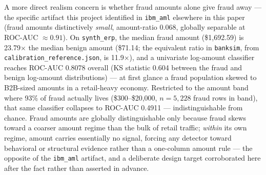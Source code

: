 \begin{table}[t]
\centering
\small
\caption{Realism audit: \texttt{synth\_erp} vs.\ the real-dataset reference band (min--max across \texttt{ibm\_aml}, \texttt{banksim}, \texttt{sap\_wurzburg}, \texttt{paysim}). Source: \texttt{calibration\_reference.json}, \texttt{synth\_erp\_realism.json}.}
\label{tab:synth-realism}
\end{table}

A more direct realism concern is whether fraud amounts alone give fraud away —
the specific artifact this project identified in \texttt{ibm\_aml} elsewhere in
this paper (fraud amounts distinctively \emph{small}, amount-ratio 0.068,
globally separable at ROC-AUC $\approx 0.91$). On \texttt{synth\_erp}, the
median fraud amount (\$1{,}692.59) is 23.79$\times$ the median benign amount
(\$71.14; the equivalent ratio in \texttt{banksim}, from
\texttt{calibration\_reference.json}, is 11.9$\times$), and a univariate
log-amount classifier reaches ROC-AUC 0.8078 overall (KS statistic 0.604
between the fraud and benign log-amount distributions) — at first glance a
fraud population skewed to B2B-sized amounts in a retail-heavy economy.
Restricted to the amount band where 93\% of fraud actually lives
(\$300--\$20{,}000, $n=5{,}228$ fraud rows in band), that same classifier
collapses to ROC-AUC 0.4911 — indistinguishable from chance. Fraud amounts
are globally distinguishable only because fraud skews toward a coarser amount
regime than the bulk of retail traffic; \emph{within} its own regime, amount
carries essentially no signal, forcing any detector toward behavioral or
structural evidence rather than a one-column amount rule — the opposite of
the \texttt{ibm\_aml} artifact, and a deliberate design target corroborated
here after the fact rather than asserted in advance.

